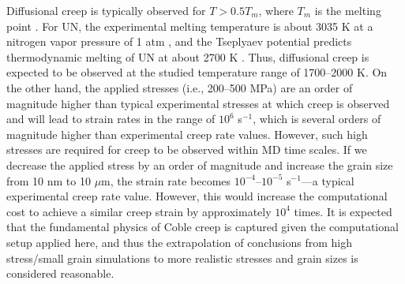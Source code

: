 \documentclass[preprint, 12pt]{elsarticle}
\newcommand{\?}{\stackrel{?}{=}}
\begin{document}
Diffusional creep is typically observed for $T > 0.5 T_m$, where $T_m$ is the melting point \cite{Courtney2005}. For UN, the experimental melting temperature is about 3035 K at a nitrogen vapor pressure of 1 atm \cite{Hayes1990IV}, and the Tseplyaev potential predicts thermodynamic melting of UN at about 2700 K \cite{AbdulHameed2024}. Thus, diffusional creep is expected to be observed at the studied temperature range of 1700--2000 K. On the other hand, the applied stresses (i.e., 200--500 MPa) are an order of magnitude higher than typical experimental stresses at which creep is observed and will lead to strain rates in the range of $10^6$ s$^{-1}$, which is several orders of magnitude higher than experimental creep rate values. However, such high stresses are required for creep to be observed within MD time scales. If we decrease the applied stress by an order of magnitude and increase the grain size from 10 nm to 10 $\mu$m, the strain rate becomes $10^{-4}$--$10^{-5}$ s$^{-1}$---a typical experimental creep rate value. However, this would increase the computational cost to achieve a similar creep strain by approximately $10^4$ times. It is expected that the fundamental physics of Coble creep is captured given the computational setup applied here, and thus the extrapolation of conclusions from high stress/small grain simulations to more realistic stresses and grain sizes is considered reasonable.
\end{document}
